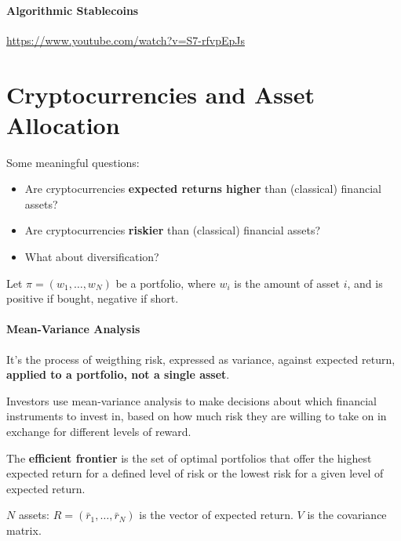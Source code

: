 
\paragraph{Algorithmic Stablecoins}\leavevmode
\url{https://www.youtube.com/watch?v=S7-rfvpEpJs}



\section{Cryptocurrencies and Asset Allocation}

Some meaningful questions:
\begin{itemize}
    \item Are cryptocurrencies \textbf{expected returns higher} than (classical) financial assets?
    \item Are cryptocurrencies \textbf{riskier} than (classical) financial assets?
    \item What about diversification?
\end{itemize}

Let $\pi =(w_{1},\ldots,w_{N})$ be a portfolio, where $w_{i}$ is the amount of asset $i$, and is positive if bought, negative if short.

\paragraph{Mean-Variance Analysis}

It's the process of weigthing risk, expressed as variance, against expected return, \textbf{applied to a portfolio, not a single asset}.

Investors use mean-variance analysis to make decisions about which financial instruments to invest in, based on how much risk they are willing to take on in exchange for different levels of reward.

The \textbf{efficient frontier} is the set of optimal portfolios that offer the highest expected return for a defined level of risk or the lowest risk for a given level of expected return.


$N$ assets: $R=(\bar{r}_1,\ldots,\bar{r}_N)$ is the vector of expected return. $V$ is the covariance matrix.


